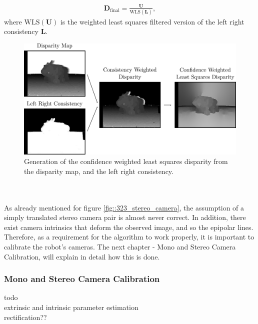 \begin{align}
	\bm{D}_\text{final} = \frac{\bm{U}}{\text{WLS}(\bm{L})},
\end{align}
where $\text{WLS}(\bm{U})$ is the weighted least squares filtered version of the left right consistency $\bm{L}$.
\begin{figure}[h]
	\centering
	\includegraphics[scale=.28]{chapters/03_background/img/weighted_least_squares_disparity.png}
	\caption{Generation of the confidence weighted least squares disparity from the disparity map, and the left right consistency.}
	\label{fig::323_weighted_least_squares_disparity}
\end{figure}
\\\\
As already mentioned for figure \ref{fig::323_stereo_camera}, the assumption of a simply translated stereo camera pair is almost never correct. In addition, there exist camera intrinsics that deform the observed image, and so the epipolar lines. Therefore, as a requirement for the algorithm to work properly, it is important to calibrate the robot's cameras. The next chapter - Mono and Stereo Camera Calibration, will explain in detail how this is done.
\subsubsection{Mono and Stereo Camera Calibration}
todo \\
\cite{zhang2000flexible} extrinsic and intrinsic parameter estimation \\
\cite{loop1999computing} rectification??\\